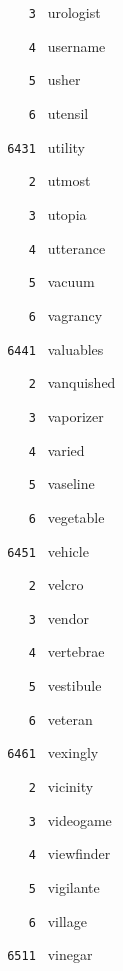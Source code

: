\documentclass[11pt]{article}
\begin{document}
\begin{multicols}{6}
\noindent \texttt{ \ \ \ 3 } urologist  \par
\noindent \texttt{ \ \ \ 4 } username  \par
\noindent \texttt{ \ \ \ 5 } usher  \par
\noindent \texttt{ \ \ \ 6 } utensil  \par
\vspace{3mm}
\noindent \texttt{ 6431 } utility  \par
\noindent \texttt{ \ \ \ 2 } utmost  \par
\noindent \texttt{ \ \ \ 3 } utopia  \par
\noindent \texttt{ \ \ \ 4 } utterance  \par
\noindent \texttt{ \ \ \ 5 } vacuum  \par
\noindent \texttt{ \ \ \ 6 } vagrancy  \par
\vspace{3mm}
\noindent \texttt{ 6441 } valuables  \par
\noindent \texttt{ \ \ \ 2 } vanquished  \par
\noindent \texttt{ \ \ \ 3 } vaporizer  \par
\noindent \texttt{ \ \ \ 4 } varied  \par
\noindent \texttt{ \ \ \ 5 } vaseline  \par
\noindent \texttt{ \ \ \ 6 } vegetable  \par
\vspace{3mm}
\noindent \texttt{ 6451 } vehicle  \par
\noindent \texttt{ \ \ \ 2 } velcro  \par
\noindent \texttt{ \ \ \ 3 } vendor  \par
\noindent \texttt{ \ \ \ 4 } vertebrae  \par
\noindent \texttt{ \ \ \ 5 } vestibule  \par
\noindent \texttt{ \ \ \ 6 } veteran  \par
\vspace{3mm}
\noindent \texttt{ 6461 } vexingly  \par
\noindent \texttt{ \ \ \ 2 } vicinity  \par
\noindent \texttt{ \ \ \ 3 } videogame  \par
\noindent \texttt{ \ \ \ 4 } viewfinder  \par
\noindent \texttt{ \ \ \ 5 } vigilante  \par
\noindent \texttt{ \ \ \ 6 } village  \par
\noindent \texttt{ 6511 } vinegar  \par

\end{multicols}
\end{document}
